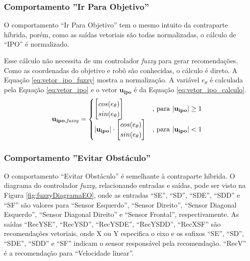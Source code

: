 	\subsubsection{Comportamento ''Ir Para Objetivo''}
	
	O comportamento ``Ir Para Objetivo'' tem o mesmo intuito da contraparte híbrida, porém, 
	como as saídas vetoriais são todas normalizadas, o cálculo de ``IPO'' é normalizado.
	
	Esse cálculo não necessita de um controlador \textit{fuzzy} para gerar recomendações. Como as 
	coordenadas do objetivo e robô são conhecidas, o cálculo é direto. A Equação 
	\ref{eq:vetor_ipo_fuzzy} mostra a normalização. A variável $e_\theta$ é calculada pela
	Equação \ref{eq:vetor_ipo} e o vetor $\mathbf{u_{ipo}}$ é da Equação 
	\ref{eq:vetor_ipo_calculo}.
	\begin{equation}
		\label{eq:vetor_ipo_fuzzy}
			\mathbf{u_{ipo,\mathit{fuzzy}}} = 
			\begin{cases}
				\mleft[
				\begin{matrix}
		  			cos(e_\theta) \\
		  			sin(e_\theta) \\
				\end{matrix}
				\mright] & \text{, para} \ | \mathbf{u_{ipo}} | \geq 1 \\
				| \mathbf{u_{ipo}} | \cdot \mleft[
				\begin{matrix}
		  			cos(e_\theta) \\
		  			sin(e_\theta) \\
				\end{matrix}
				\mright] & \text{, para} \ | \mathbf{u_{ipo}} | < 1 \\
			\end{cases}
	\end{equation}
	
	\subsubsection{Comportamento ''Evitar Obstáculo''}
	
	O comportamento ``Evitar Obstáculo'' é semelhante à contraparte híbrida. O diagrama do
	controlador \textit{fuzzy}, relacionando entradas e saídas, pode ser visto na Figura 
	\ref{fig:fuzzyDiagramaEO}, onde as entradas ``SE'', ``SD'', ``SDE'', ``SDD'' e ``SF'' são
	valores para ``Sensor Esquerdo'', ``Sensor Direito'', ``Sensor Diagonal Esquerdo'', 
	``Sensor Diagonal Direito'' e ``Sensor Frontal'', respectivamente. As saídas ``RecYSE'',
	``RecYSD'', ``RecYSDE'', ``RecYSDD'', ``RecXSF'' são recomendações vetoriais, onde X ou Y
	especifica o eixo e os sufixos ``SE'', ``SD'', ``SDE'', ``SDD'' e ``SF'' indicam o sensor
	responsável pela recomendação. ``RecV'' é a recomendação para ``Velocidade linear''.
	
